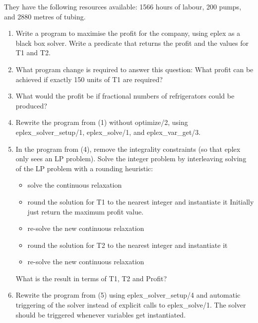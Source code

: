 They have the following resources available: 1566 hours of labour, 200
pumps, and 2880 metres of tubing.



\begin{enumerate}
\item Write a program to maximise the profit for the company, using eplex
as a black box solver.   Write a predicate that returns the profit and the
    values for T1 and T2.

\item What program change is required to answer this question:
    What profit can be achieved if exactly 150 units of T1 are required?

\item What would the profit be if fractional numbers of refrigerators could
    be produced?

\item Rewrite the program from (1) without optimize/2, using
    eplex_solver_setup/1, eplex_solve/1, and eplex_var_get/3.

\item In the program from (4), remove the integrality constraints (so that eplex
    only sees an LP problem).  Solve the integer problem by interleaving
    solving of the LP problem with a rounding heuristic:

\begin{itemize}
    \item solve the continuous relaxation
    \item round the solution for T1 to the nearest integer and instantiate it
Initially just return the maximum profit value.
    \item re-solve the new continuous relaxation
    \item round the solution for T2 to the nearest integer and instantiate it
    \item re-solve the new continuous relaxation
\end{itemize}

    What is the result in terms of T1, T2 and Profit?
 
\item Rewrite the program from (5) using eplex_solver_setup/4 and automatic
    triggering of the solver instead of explicit calls to eplex_solve/1.
    The solver should be triggered whenever variables get instantiated.
\end{enumerate}


